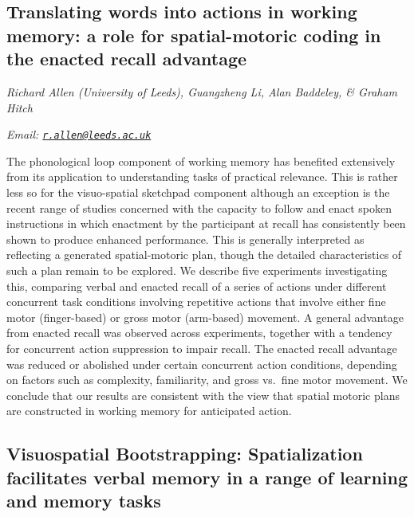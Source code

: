 \documentclass[12pt,]{book}
\begin{document}
\hypertarget{translating-words-into-actions-in-working-memory-a-role-for-spatial-motoric-coding-in-the-enacted-recall-advantage}{%
\subsection{Translating words into actions in working memory: a role for spatial-motoric coding in the enacted recall advantage}\label{translating-words-into-actions-in-working-memory-a-role-for-spatial-motoric-coding-in-the-enacted-recall-advantage}}

\emph{Richard Allen (University of Leeds), Guangzheng Li, Alan Baddeley, \& Graham Hitch}

\emph{Email: \href{mailto:r.allen@leeds.ac.uk}{\nolinkurl{r.allen@leeds.ac.uk}}}

The phonological loop component of working memory has benefited extensively from its application to understanding tasks of practical relevance. This is rather less so for the visuo-spatial sketchpad component although an exception is the recent range of studies concerned with the capacity to follow and enact spoken instructions in which enactment by the participant at recall has consistently been shown to produce enhanced performance. This is generally interpreted as reflecting a generated spatial-motoric plan, though the detailed characteristics of such a plan remain to be explored. We describe five experiments investigating this, comparing verbal and enacted recall of a series of actions under different concurrent task conditions involving repetitive actions that involve either fine motor (finger-based) or gross motor (arm-based) movement. A general advantage from enacted recall was observed across experiments, together with a tendency for concurrent action suppression to impair recall. The enacted recall advantage was reduced or abolished under certain concurrent action conditions, depending on factors such as complexity, familiarity, and gross vs.~fine motor movement. We conclude that our results are consistent with the view that spatial motoric plans are constructed in working memory for anticipated action.

\hypertarget{visuospatial-bootstrapping-spatialization-facilitates-verbal-memory-in-a-range-of-learning-and-memory-tasks}{%
\subsection{Visuospatial Bootstrapping: Spatialization facilitates verbal memory in a range of learning and memory tasks}\label{visuospatial-bootstrapping-spatialization-facilitates-verbal-memory-in-a-range-of-learning-and-memory-tasks}}
\end{document}
